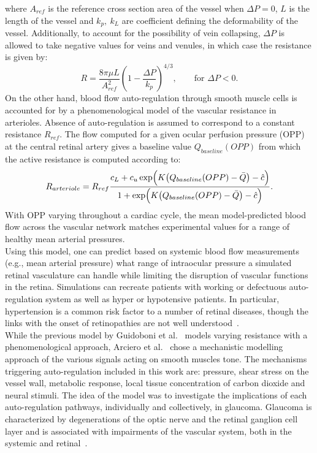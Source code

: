 \documentclass[12pt,a4paper]{article}
\begin{document}
where $A_{ref}$ is the reference cross section area of the vessel when $\Delta P = 0$, $L$ is the length of the vessel and $k_p,~k_L$ are coefficient defining the deformability of the vessel.
Additionally, to account for the possibility of vein collapsing, $\Delta P$ is allowed to take negative values for veins and venules, in which case the resistance is given by:
\begin{equation*}
  \label{eq:PassiveVariableResistanceCollapse}
  R = \frac{8\pi\mu L}{A^2_{ref}}\left(1-\frac{\Delta P}{k_p}\right)^{4/3},\qquad \text{for } \Delta P<0.
\end{equation*}
On the other hand, blood flow auto-regulation through smooth muscle cells is accounted for by a phenomenological model of the vascular resistance in arterioles.
Absence of auto-regulation is assumed to correspond to a constant resistance $R_{ref}$.
The flow computed for a given ocular perfusion pressure (OPP) at the central retinal artery gives a baseline value $Q_{baseline}(OPP)$ from which the active resistance is computed according to:
\begin{equation*}
  \label{eq:ActiveResistancePhenomenological}
  R_{arteriole} = R_{ref}\frac{c_L + c_u\exp\Bigl(K\bigl(Q_{baseline}(OPP)-\bar Q\bigr)-\hat c\Bigr)}{1 + \exp\Bigl(K\bigl(Q_{baseline}(OPP)-\bar Q\bigr)-\hat c\Bigr)}.
\end{equation*}
With OPP varying throughout a cardiac cycle, the mean model-predicted blood flow across the vascular network matches experimental values for a range of healthy mean arterial pressures.\\
Using this model, one can predict based on systemic blood flow measurements (e.g., mean arterial pressure) what range of intraocular pressure a simulated retinal vasculature can handle while limiting the disruption of vascular functions in the retina.
Simulations can recreate patients with working or defectuous auto-regulation system as well as hyper or hypotensive patients.
In particular, hypertension is a common risk factor to a number of retinal diseases, though the links with the onset of retinopathies are not well understood~\cite{Klein_2004, Leeman_2019}.\\

While the previous model by Guidoboni et al.~\cite{Guidoboni_2014b} models varying resistance with a phenomenological approach, Arciero et al.~\cite{Arciero_2013} chose a mechanistic modelling approach of the various signals acting on smooth muscles tone.
The mechanisms triggering auto-regulation included in this work are: pressure, shear stress on the vessel wall, metabolic response, local tissue concentration of carbon dioxide and neural stimuli.
The idea of the model was to investigate the implications of each auto-regulation pathways, individually and collectively, in glaucoma.
Glaucoma is characterized by degenerations of the optic nerve and the retinal ganglion cell layer and is associated with impairments of the vascular system, both in the systemic and retinal~\cite{Hulsman_2007, Bonomi_2000}.
\end{document}
